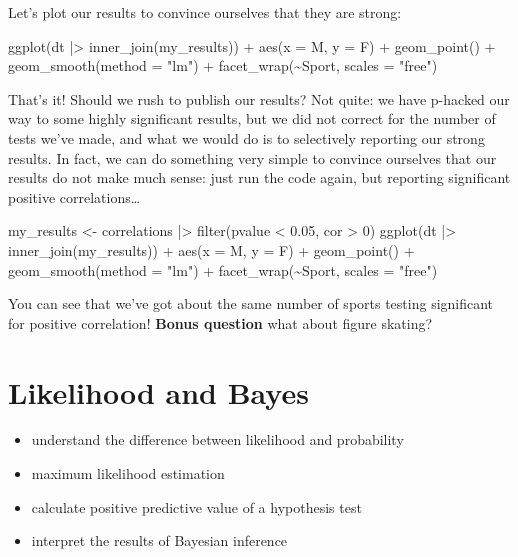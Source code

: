\documentclass[
  letterpaper,
  DIV=11,
  numbers=noendperiod]{scrreprt}
\newenvironment{Shaded}{\begin{snugshade}}{\end{snugshade}}
\newcommand{\NormalTok}[1]{\textcolor[rgb]{0.00,0.23,0.31}{#1}}
\providecommand{\tightlist}{%
  \setlength{\itemsep}{0pt}\setlength{\parskip}{0pt}}\usepackage{longtable,booktabs,array}
\begin{document}
Let's plot our results to convince ourselves that they are strong:

\begin{Shaded}
\begin{Highlighting}[]
\NormalTok{ggplot(dt |\textgreater{} inner\_join(my\_results)) + }
\NormalTok{  aes(x = \textasciigrave{}M\textasciigrave{}, y = \textasciigrave{}F\textasciigrave{}) + }
\NormalTok{  geom\_point() + }
\NormalTok{  geom\_smooth(method = "lm") + }
\NormalTok{  facet\_wrap(\textasciitilde{}Sport, scales = "free")}
\end{Highlighting}
\end{Shaded}

That's it! Should we rush to publish our results? Not quite: we have
p-hacked our way to some highly significant results, but we did not
correct for the number of tests we've made, and what we would do is to
selectively reporting our strong results. In fact, we can do something
very simple to convince ourselves that our results do not make much
sense: just run the code again, but reporting significant positive
correlations\ldots{}

\begin{Shaded}
\begin{Highlighting}[]
\NormalTok{my\_results \textless{}{-} correlations |\textgreater{} filter(pvalue \textless{} 0.05, cor \textgreater{} 0)}
\NormalTok{ggplot(dt |\textgreater{} inner\_join(my\_results)) + }
\NormalTok{  aes(x = \textasciigrave{}M\textasciigrave{}, y = \textasciigrave{}F\textasciigrave{}) + }
\NormalTok{  geom\_point() + }
\NormalTok{  geom\_smooth(method = "lm") + }
\NormalTok{  facet\_wrap(\textasciitilde{}Sport, scales = "free")}
\end{Highlighting}
\end{Shaded}

You can see that we've got about the same number of sports testing
significant for positive correlation! \textbf{Bonus question} what about
figure skating?


\chapter{Likelihood and Bayes}\label{likelihood-and-bayes}

\begin{itemize}
\tightlist
\item
  understand the difference between likelihood and probability
\item
  maximum likelihood estimation
\item
  calculate positive predictive value of a hypothesis test
\item
  interpret the results of Bayesian inference
\end{itemize}
\end{document}
